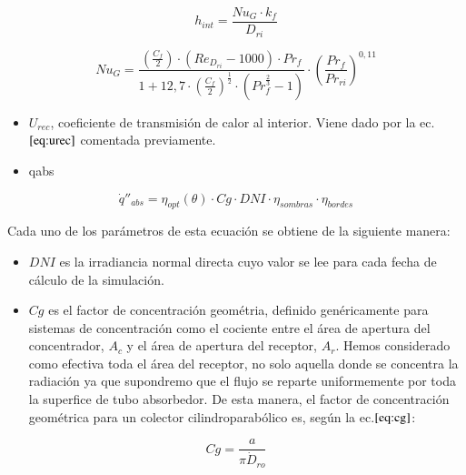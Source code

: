 \documentclass[12pt]{report} %
\begin{document}
\begin{equation}
    h_{int} = \frac{Nu_{G}\cdot k_f }{D_{ri}}
    \label{eq:hint}
\end{equation}

\begin{equation}
    Nu_{G} = \frac{ \left( \frac{C_f}{2} \right)\cdot\left( Re_{D_{ri}} - 1000 \right)\cdot Pr_f }{1 + 12,7 \cdot \left(\frac{C_f}{2} \right)^{\frac{1}{2}}\cdot \left(Pr^{\frac{2}{3}}_f -1 \right)} \cdot \left( \frac{Pr_f}{Pr_{ri}} \right)^{0,11}
    \label{eq:nug}
\end{equation}

\begin{itemize}
\item
  \(U_{rec}\), coeficiente de transmisión de calor al interior. Viene   dado por la ec.\(\eqref{eq:urec}\) comentada previamente. 
\item
qabs
\end{itemize}

\begin{equation}
\dot q''_{abs}= \eta_{opt}(\theta) \cdot Cg \cdot DNI \cdot \eta_{sombras} \cdot \eta_{bordes} 
\end{equation}

Cada uno de los parámetros de esta ecuación se obtiene de la siguiente manera:

\begin{itemize}
\item
  \(DNI\) es la irradiancia normal directa cuyo valor se lee para cada   fecha de cálculo de la simulación.
\item
  \(Cg\) es el factor de concentración geométria, definido genéricamente   para sistemas de concentración como el cociente entre el área de   apertura del concentrador, \(A_c\) y el área de apertura del receptor,   \(A_r\). Hemos considerado como efectiva toda el área del receptor, no   solo aquella donde se concentra la radiación ya que supondremo que el   flujo se reparte uniformemente por toda la superfice de tubo   absorbedor. De esta manera, el factor de concentración geométrica para   un colector cilindroparabólico es, según la ec.\(\eqref{eq:cg}\):
\end{itemize}

\begin{equation}
   Cg = \frac{a}{\pi \dot D_{ro}}
    \label{eq:cg}
\end{equation}
\end{document}
